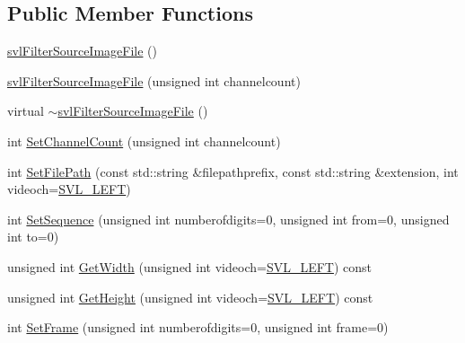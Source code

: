 \subsection*{Public Member Functions}
\begin{DoxyCompactItemize}
\item 
\hyperlink{classsvl_filter_source_image_file_a6f07ade4e9be00f15d76ddb7a671d0a5}{svl\-Filter\-Source\-Image\-File} ()
\item 
\hyperlink{classsvl_filter_source_image_file_a9663242d224bcdbbadb87cfe04b5af30}{svl\-Filter\-Source\-Image\-File} (unsigned int channelcount)
\item 
virtual \hyperlink{classsvl_filter_source_image_file_af9dd27aaf64de31638a166ca525170b9}{$\sim$svl\-Filter\-Source\-Image\-File} ()
\item 
int \hyperlink{classsvl_filter_source_image_file_a4e199aa56ce6416ef8b5a0b0110a091c}{Set\-Channel\-Count} (unsigned int channelcount)
\item 
int \hyperlink{classsvl_filter_source_image_file_a802c3c4e4164706d9625ab77c86db815}{Set\-File\-Path} (const std\-::string \&filepathprefix, const std\-::string \&extension, int videoch=\hyperlink{svl_definitions_8h_ab9fec7615f19c8df2919eebcab0b187f}{S\-V\-L\-\_\-\-L\-E\-F\-T})
\item 
int \hyperlink{classsvl_filter_source_image_file_a2d704205e8e9f15ff95b48daed38f4fb}{Set\-Sequence} (unsigned int numberofdigits=0, unsigned int from=0, unsigned int to=0)
\item 
unsigned int \hyperlink{classsvl_filter_source_image_file_ac30b1779d2dfa79b3d58509473dead79}{Get\-Width} (unsigned int videoch=\hyperlink{svl_definitions_8h_ab9fec7615f19c8df2919eebcab0b187f}{S\-V\-L\-\_\-\-L\-E\-F\-T}) const 
\item 
unsigned int \hyperlink{classsvl_filter_source_image_file_a2c0a9c7f7746ad6a481dbdff47697795}{Get\-Height} (unsigned int videoch=\hyperlink{svl_definitions_8h_ab9fec7615f19c8df2919eebcab0b187f}{S\-V\-L\-\_\-\-L\-E\-F\-T}) const 
\item 
int \hyperlink{classsvl_filter_source_image_file_ae929ec5b37f5ce33fd7811e733c651f8}{Set\-Frame} (unsigned int numberofdigits=0, unsigned int frame=0)
\end{DoxyCompactItemize}
